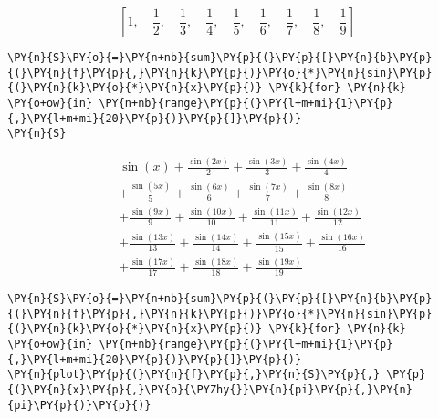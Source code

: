             
    
    $$\left [ 1, \quad \frac{1}{2}, \quad \frac{1}{3}, \quad \frac{1}{4}, \quad \frac{1}{5}, \quad \frac{1}{6}, \quad \frac{1}{7}, \quad \frac{1}{8}, \quad \frac{1}{9}\right ]$$

    

    \begin{tcolorbox}[breakable, size=fbox, boxrule=1pt, pad at break*=1mm,colback=cellbackground, colframe=cellborder]
\begin{Verbatim}[commandchars=\\\{\}]
\PY{n}{S}\PY{o}{=}\PY{n+nb}{sum}\PY{p}{(}\PY{p}{[}\PY{n}{b}\PY{p}{(}\PY{n}{f}\PY{p}{,}\PY{n}{k}\PY{p}{)}\PY{o}{*}\PY{n}{sin}\PY{p}{(}\PY{n}{k}\PY{o}{*}\PY{n}{x}\PY{p}{)} \PY{k}{for} \PY{n}{k} \PY{o+ow}{in} \PY{n+nb}{range}\PY{p}{(}\PY{l+m+mi}{1}\PY{p}{,}\PY{l+m+mi}{20}\PY{p}{)}\PY{p}{]}\PY{p}{)}
\PY{n}{S}
\end{Verbatim}
\end{tcolorbox}
 
            
    
		\[\begin{split}
		&\sin{\left (x \right )} + \frac{\sin{\left (2 x \right )}}{2} + \frac{\sin{\left (3 x \right )}}{3} + \frac{\sin{\left (4 x \right )}}{4}
		\\&+\frac{\sin{\left (5 x \right )}}{5} + \frac{\sin{\left (6 x \right )}}{6} + \frac{\sin{\left (7 x \right )}}{7} +\frac{\sin{\left (8 x \right )}}{8} \\
		&+ \frac{\sin{\left (9 x \right )}}{9} + \frac{\sin{\left (10 x \right )}}{10} + \frac{\sin{\left (11 x \right )}}{11} 
		+ \frac{\sin{\left (12 x \right )}}{12} \\
		&+ \frac{\sin{\left (13 x \right )}}{13} + \frac{\sin{\left (14 x \right )}}{14} + \frac{\sin{\left (15 x \right )}}{15} + \frac{\sin{\left (16 x \right )}}{16} \\
		&+ \frac{\sin{\left (17 x \right )}}{17} + \frac{\sin{\left (18 x \right )}}{18} + \frac{\sin{\left (19 x \right )}}{19}
		\end{split}\]

    

    \begin{tcolorbox}[breakable, size=fbox, boxrule=1pt, pad at break*=1mm,colback=cellbackground, colframe=cellborder]
\begin{Verbatim}[commandchars=\\\{\}]
\PY{n}{S}\PY{o}{=}\PY{n+nb}{sum}\PY{p}{(}\PY{p}{[}\PY{n}{b}\PY{p}{(}\PY{n}{f}\PY{p}{,}\PY{n}{k}\PY{p}{)}\PY{o}{*}\PY{n}{sin}\PY{p}{(}\PY{n}{k}\PY{o}{*}\PY{n}{x}\PY{p}{)} \PY{k}{for} \PY{n}{k} \PY{o+ow}{in} \PY{n+nb}{range}\PY{p}{(}\PY{l+m+mi}{1}\PY{p}{,}\PY{l+m+mi}{20}\PY{p}{)}\PY{p}{]}\PY{p}{)}
\PY{n}{plot}\PY{p}{(}\PY{n}{f}\PY{p}{,}\PY{n}{S}\PY{p}{,} \PY{p}{(}\PY{n}{x}\PY{p}{,}\PY{o}{\PYZhy{}}\PY{n}{pi}\PY{p}{,}\PY{n}{pi}\PY{p}{)}\PY{p}{)}
\end{Verbatim}
\end{tcolorbox}

